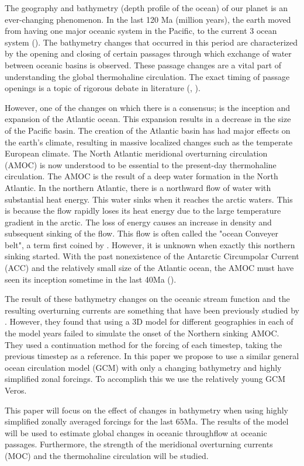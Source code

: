 The geography and bathymetry (depth profile of the ocean) of our planet is an ever-changing phenomenon. In the last 120 Ma (million years), the earth moved from having one major oceanic system in the Pacific, to the current 3 ocean system (\cite{besse2002apparent}). The bathymetry changes that occurred in this period are characterized by the opening and closing of certain passages through which exchange of water between oceanic basins is observed. These passage changes are a vital part of understanding the global thermohaline circulation.  The exact timing of passage openings is a topic of rigorous debate in literature (\cite{Scher2006Apr}, \cite{Schmidt2007Jan}).

However, one of the changes on which there is a consensus; is the inception and expansion of the Atlantic ocean. This expansion results in a decrease in the size of the Pacific basin. The creation of the Atlantic basin has had major effects on the earth's climate, resulting in massive localized changes such as the temperate European climate. The North Atlantic meridional overturning circulation (AMOC) is now understood to be essential to the present-day thermohaline circulation. The AMOC is the result of a deep water formation in the North Atlantic. In the northern Atlantic, there is a northward flow of water with substantial heat energy. This water sinks when it reaches the arctic waters. This is because the flow rapidly loses its heat energy due to the large temperature gradient in the arctic. The loss of energy causes an increase in density and subsequent sinking of the flow. This flow is often called the "ocean Conveyer belt", a term first coined by \cite{broecker1991great}. However, it is unknown when exactly this northern sinking started. With the past nonexistence of the Antarctic Circumpolar Current (ACC) and the relatively small size of the Atlantic ocean, the AMOC must have seen its inception sometime in the last 40Ma (\cite{Abelson2017onset}). 

The result of these bathymetry changes on the oceanic stream function and the resulting overturning currents are something that have been previously studied by \cite{Mulder2017Jul}. However, they found that using a 3D model for different geographies in each of the model years failed to simulate the onset of the Northern sinking AMOC. They used a continuation method for the forcing of each timestep, taking the previous timestep as a reference. In this paper we propose to use a similar general ocean circulation model (GCM) with only a changing bathymetry and highly simplified zonal forcings. To accomplish this we use the relatively young GCM Veros.

This paper will focus on the effect of changes in bathymetry when using highly simplified zonally averaged forcings for the last 65Ma. The results of the model will be used to estimate global changes in oceanic throughflow at oceanic passages. Furthermore, the strength of the meridional overturning currents (MOC) and the thermohaline circulation will be studied.

